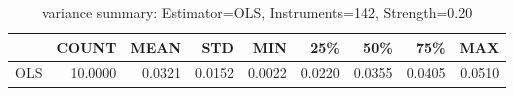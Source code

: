 \begin{table}[ht]
\centering
\caption{variance summary: Estimator=OLS, Instruments=142, Strength=0.20}
\begin{tabular}{lrrrrrrrr}
\toprule
 & COUNT & MEAN & STD & MIN & 25\% & 50\% & 75\% & MAX \\
\midrule
OLS & 10.0000 & 0.0321 & 0.0152 & 0.0022 & 0.0220 & 0.0355 & 0.0405 & 0.0510 \\
\bottomrule
\end{tabular}
\end{table}
